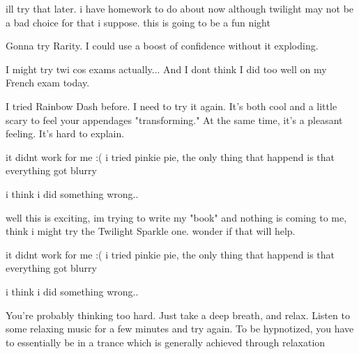 \documentclass[ebook,12pt,oneside,openany]{memoir}
\newcommand{\mytexttilde}{\raisebox{0.5ex}{\texttildelow}}
\begin{document}
\begin{tcolorbox}[title=DeleteAccount]
\par{ill try that later. i have homework to do about now although twilight may not be a bad choice for that i suppose. this is going to be a fun night}
\end{tcolorbox}
\begin{tcolorbox}[title=Leafeon]
\par{Gonna try Rarity. I could use a boost of confidence without it exploding.}
\newline{}
\par{I might try twi cos exams actually... And I dont think I did too well on my French exam today.}
\end{tcolorbox}
\begin{tcolorbox}[title=\mytexttilde{}Master\mytexttilde{} Button Mash]
\par{I tried Rainbow Dash before. I need to try it again. It's both cool and a little scary to feel your appendages "transforming." At the same time, it's a pleasant feeling. It's hard to explain.}
\end{tcolorbox}
\begin{tcolorbox}[title=Steve]
\par{it didnt work for me :( i tried pinkie pie, the only thing that happend is that everything got blurry}
\newline{}
\par{i think i did something wrong..}
\end{tcolorbox}
\begin{tcolorbox}[title=Andrew Laycock]
\par{well this is exciting, im trying to write my "book" and nothing is coming to me, think i might try the Twilight Sparkle one. wonder if that will help.}
\end{tcolorbox}
\begin{tcolorbox}[title=Lord Bababa,colback=red!5!white,colframe=red!75!black,coltitle=white]
\begin{tcolorbox}[title=STVB]
\par{it didnt work for me :( i tried pinkie pie, the only thing that happend is that everything got blurry}
\newline{}
\par{i think i did something wrong..}
\end{tcolorbox}
\par{You're probably thinking too hard. Just take a deep breath, and relax. Listen to some relaxing music for a few minutes and try again. To be hypnotized, you have to essentially be in a trance which is generally achieved through relaxation}
\end{tcolorbox}
\end{document}
